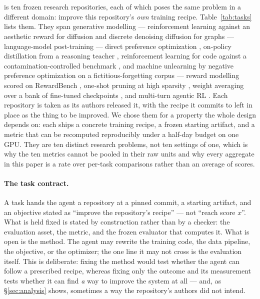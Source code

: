 \section{\ai{}}
\label{sec:benchmark}

\ai{} is ten frozen research repositories, each of which poses the same problem in a different
domain: improve this repository's \emph{own} training recipe. Table~\ref{tab:tasks} lists them.
They span generative modelling --- reinforcement learning against an aesthetic reward for diffusion
\citep{black2023ddpo} and discrete denoising diffusion for graphs \citep{vignac2023digress} ---
language-model post-training --- direct preference optimization \citep{rafailov2023dpo}, on-policy
distillation from a reasoning teacher \citep{deepseek2025r1}, reinforcement learning for code against
a contamination-controlled benchmark \citep{jain2024livecodebench}, and machine unlearning by negative
preference optimization on a fictitious-forgetting corpus \citep{zhang2024npo,maini2024tofu} ---
reward modelling scored on RewardBench \citep{lambert2024rewardbench}, one-shot pruning at high
sparsity \citep{sun2024wanda,yin2024owl}, weight averaging over a bank of fine-tuned checkpoints
\citep{wortsman2022modelsoups}, and multi-turn agentic RL \citep{wang2025ragen}. Each repository is
taken as its authors released it, with the recipe it commits to left in place as the thing to be
improved. We chose
them for a property the whole design depends on: each ships a concrete training recipe, a frozen
starting artifact, and a metric that can be recomputed reproducibly under a half-day budget on one
GPU. They are ten distinct research problems, not ten settings of one, which is why the ten metrics
cannot be pooled in their raw units and why every aggregate in this paper is a rate over
per-task comparisons rather than an average of scores.

\paragraph{The task contract.} A task hands the agent a repository at a pinned commit, a starting
artifact, and an objective stated as ``improve the repository's recipe'' --- not ``reach score
$x$''. What is held fixed is stated by construction rather than by a checker: the evaluation asset,
the metric, and the frozen evaluator that computes it. What is open is the method. The agent may
rewrite the training code, the data pipeline, the objective, or the optimizer; the one line it may
not cross is the evaluation itself. This is deliberate: fixing the method
would test whether the agent can follow a prescribed recipe, whereas fixing only the outcome and its
measurement tests whether it can find \emph{a} way to improve the system at all --- and, as
\S\ref{sec:analysis} shows, sometimes a way the repository's authors did not intend.

